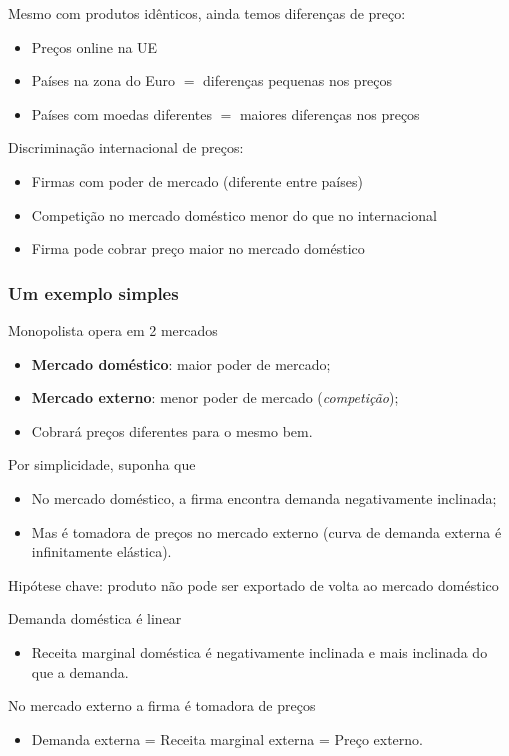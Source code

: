 \documentclass[a4paper,12pt]{article}[abntex2]
\begin{document}
Mesmo com produtos idênticos, ainda temos diferenças de preço:
\begin{itemize}
  \item Preços online na UE
  \item Países na zona do Euro $=$ diferenças pequenas nos preços
  \item Países com moedas diferentes $=$ maiores diferenças nos preços
\end{itemize}

Discriminação internacional de preços:
\begin{itemize}
  \item Firmas com poder de mercado (diferente entre países)
  \item Competição no mercado doméstico menor do que no internacional
  \item Firma pode cobrar preço maior no mercado doméstico
\end{itemize}

\subsubsection{\textbf{Um exemplo simples}}
Monopolista opera em 2 mercados
\begin{itemize}
    \item \textbf{Mercado doméstico}: maior poder de mercado;
    \item \textbf{Mercado externo}: menor poder de mercado (\textit{competição});
    \item Cobrará preços diferentes para o mesmo bem.
\end{itemize}

Por simplicidade, suponha que
\begin{itemize}
    \item No mercado doméstico, a firma encontra demanda negativamente inclinada;
    \item Mas é tomadora de preços no mercado externo (curva de demanda externa é infinitamente elástica).
\end{itemize}

Hipótese chave: produto não pode ser exportado de volta ao mercado doméstico

Demanda doméstica é linear
\begin{itemize}
    \item Receita marginal doméstica é negativamente inclinada e mais inclinada do que a demanda.
\end{itemize}

No mercado externo a firma é tomadora de preços
\begin{itemize}
    \item Demanda externa = Receita marginal externa = Preço externo.
\end{itemize}
\end{document}
